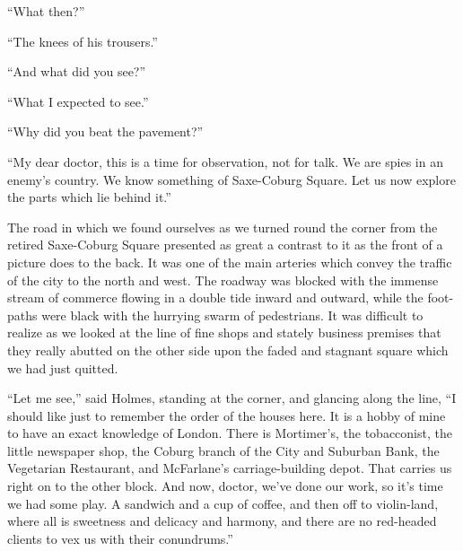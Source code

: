 “What then?”

“The knees of his trousers.”

“And what did you see?”

“What I expected to see.”

“Why did you beat the pavement?”

“My dear doctor, this is a time for observation, not for
talk. We are spies in an enemy’s country. We know something
of Saxe-Coburg Square. Let us now explore the parts
which lie behind it.”

The road in which we found ourselves as we turned round
the corner from the retired Saxe-Coburg Square presented as
great a contrast to it as the front of a picture does to the
back. It was one of the main arteries which convey the
traffic of the city to the north and west. The roadway was
blocked with the immense stream of commerce flowing in a
double tide inward and outward, while the foot-paths were
black with the hurrying swarm of pedestrians. It was difficult
to realize as we looked at the line of fine shops and
stately business premises that they really abutted on the
other side upon the faded and stagnant square which we had
just quitted.

“Let me see,” said Holmes, standing at the corner, and
glancing along the line, “I should like just to remember the
order of the houses here. It is a hobby of mine to have an
exact knowledge of London. There is Mortimer’s, the tobacconist,
the little newspaper shop, the Coburg branch of the
City and Suburban Bank, the Vegetarian Restaurant, and
McFarlane’s carriage-building depot. That carries us right
on to the other block. And now, doctor, we’ve done our
work, so it’s time we had some play. A sandwich and a cup
of coffee, and then off to violin-land, where all is sweetness
and delicacy and harmony, and there are no red-headed clients
to vex us with their conundrums.”

